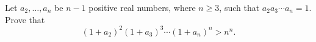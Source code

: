 Let $a_2, \ldots, a_n$ be $n-1$ positive real numbers, where $n \geq 3$, such that $a_2 a_3 \cdots a_n = 1$. Prove that
\[
(1 + a_2)^2 (1 + a_3)^3 \cdots (1 + a_n)^n > n^n.
\]
